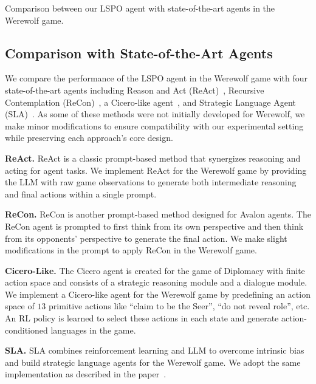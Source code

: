 \begin{table*}[t]
    \centering
    
    \caption{Comparison between our LSPO agent with state-of-the-art agents in the Werewolf game.}
    \label{tab:head2head}
\end{table*}


\subsection{Comparison with State-of-the-Art Agents}

We compare the performance of the LSPO agent in the Werewolf game with four state-of-the-art agents including Reason and Act (ReAct)~\cite{yao2022react}, Recursive Contemplation (ReCon)~\cite{wang2023avalon}, a Cicero-like agent~\cite{meta2022human}, and Strategic Language Agent (SLA)~\cite{xu2023language}. As some of these methods were not initially developed for Werewolf, we make minor modifications to ensure compatibility with our experimental setting while preserving each approach’s core design. 

\textbf{ReAct.}
ReAct is a classic prompt-based method that synergizes reasoning and acting for agent tasks. We implement ReAct for the Werewolf game by providing the LLM with raw game observations to generate both intermediate reasoning and final actions within a single prompt.

\textbf{ReCon.}
ReCon is another prompt-based method designed for Avalon agents. The ReCon agent is prompted to first think from its own perspective and then think from its opponents' perspective to generate the final action. We make slight modifications in the prompt to apply ReCon in the Werewolf game.

\textbf{Cicero-Like.}
The Cicero agent is created for the game of Diplomacy with finite action space and consists of a strategic reasoning module and a dialogue module. We implement a Cicero-like agent for the Werewolf game by predefining an action space of $13$ primitive actions like ``claim to be the Seer'', ``do not reveal role'', etc. An RL policy is learned to select these actions in each state and generate action-conditioned languages in the game.

\textbf{SLA.}
SLA combines reinforcement learning and LLM to overcome intrinsic bias and build strategic language agents for the Werewolf game. We adopt the same implementation as described in the paper~\cite{xu2023language}.

